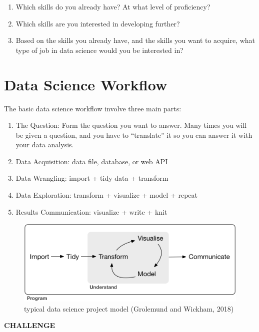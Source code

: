 \documentclass[
]{book}
\begin{document}
\begin{enumerate}
\def\labelenumi{\arabic{enumi})}
\item
  Which skills do you already have? At what level of proficiency?
\item
  Which skills are you interested in developing further?
\item
  Based on the skills you already have, and the skills you want to acquire, what type of job in data science would you be interested in?
\end{enumerate}

\hypertarget{data-science-workflow}{%
\section{Data Science Workflow}\label{data-science-workflow}}

The basic data science workflow involve three main parts:

\begin{enumerate}
\def\labelenumi{\arabic{enumi})}
\item
  The Question: Form the question you want to answer. Many times you will be given a question, and you have to ``translate'' it so you can answer it with your data analysis.
\item
  Data Acquisition: data file, database, or web API
\item
  Data Wrangling: import + tidy data + transform \citep{grolemund2018r}
\item
  Data Exploration: transform + visualize + model + repeat \citep{grolemund2018r}
\item
  Results Communication: visualize + write + knit \citep{grolemund2018r}
\end{enumerate}

\begin{figure}

{\centering \includegraphics[width=0.5\linewidth]{images/data-science} 

}

\caption{typical data science project model (Grolemund and Wickham, 2018)}\label{fig:unnamed-chunk-3}
\end{figure}

\textbf{CHALLENGE}
\end{document}
